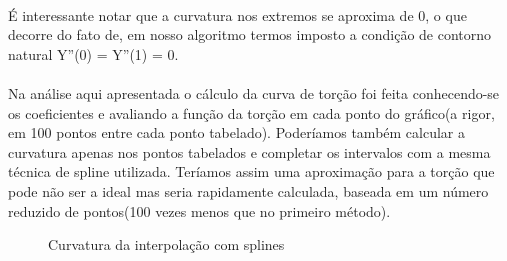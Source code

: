 \paragraph{}É interessante notar que a curvatura nos extremos se aproxima de 0, o que decorre do fato de,
em nosso algoritmo termos imposto a condição de contorno natural Y''(0) = Y''(1) = 0.

\paragraph{}Na análise aqui apresentada o cálculo da curva de torção foi feita conhecendo-se 
os coeficientes e avaliando a função da torção em cada ponto do gráfico(a rigor, em 100 pontos entre cada
ponto tabelado). Poderíamos também calcular a curvatura apenas nos pontos tabelados e completar os intervalos
com a mesma técnica de spline utilizada. Teríamos assim uma aproximação para a torção que pode não ser a ideal
mas seria rapidamente calculada, baseada em um número reduzido de pontos(100 vezes menos que no primeiro 
método).

\FloatBarrier
\begin{figure}[!htp]
	
	\caption{Curvatura da interpolação com splines}
	\label{fig:quest8}
\end{figure}
\FloatBarrier
